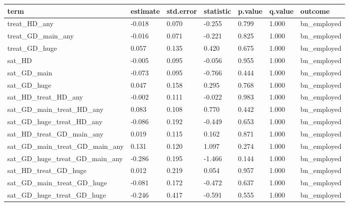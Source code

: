 \begin{tabular}{lllllll}
\toprule
term & estimate & std.error & statistic & p.value & q.value & outcome
 \\
\midrule
treat\_HD\_any & -0.018 & 0.070 & -0.255 & 0.799 & 1.000 & bn\_employed \\
treat\_GD\_main\_any & -0.016 & 0.071 & -0.221 & 0.825 & 1.000 & bn\_employed \\
treat\_GD\_huge & 0.057 & 0.135 & 0.420 & 0.675 & 1.000 & bn\_employed \\
sat\_HD & -0.005 & 0.095 & -0.056 & 0.955 & 1.000 & bn\_employed \\
sat\_GD\_main & -0.073 & 0.095 & -0.766 & 0.444 & 1.000 & bn\_employed \\
sat\_GD\_huge & 0.047 & 0.158 & 0.295 & 0.768 & 1.000 & bn\_employed \\
sat\_HD\_treat\_HD\_any & -0.002 & 0.111 & -0.022 & 0.983 & 1.000 & bn\_employed \\
sat\_GD\_main\_treat\_HD\_any & 0.083 & 0.108 & 0.770 & 0.442 & 1.000 & bn\_employed \\
sat\_GD\_huge\_treat\_HD\_any & -0.086 & 0.192 & -0.449 & 0.653 & 1.000 & bn\_employed \\
sat\_HD\_treat\_GD\_main\_any & 0.019 & 0.115 & 0.162 & 0.871 & 1.000 & bn\_employed \\
sat\_GD\_main\_treat\_GD\_main\_any & 0.131 & 0.120 & 1.097 & 0.274 & 1.000 & bn\_employed \\
sat\_GD\_huge\_treat\_GD\_main\_any & -0.286 & 0.195 & -1.466 & 0.144 & 1.000 & bn\_employed \\
sat\_HD\_treat\_GD\_huge & 0.012 & 0.219 & 0.054 & 0.957 & 1.000 & bn\_employed \\
sat\_GD\_main\_treat\_GD\_huge & -0.081 & 0.172 & -0.472 & 0.637 & 1.000 & bn\_employed \\
sat\_GD\_huge\_treat\_GD\_huge & -0.246 & 0.417 & -0.591 & 0.555 & 1.000 & bn\_employed \\
\bottomrule
\end{tabular}
